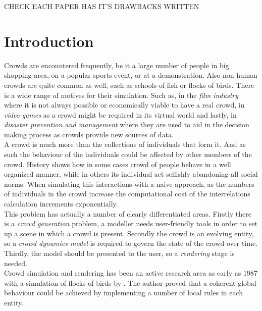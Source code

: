 \documentclass[6pt]{article} %
\begin{document}
\setcounter{page}{1} %
\columnsep 25.0pt %
\begin{multicols}{2} %
CHECK EACH PAPER HAS IT'S DRAWBACKS WRITTEN
\section{Introduction}
\label{intro}

Crowds are encountered frequently, be it a large number of people in big shopping area, on a popular sports event, or at a demonstration.
Also non human crowds are quite common as well, such as schools of fish or flocks of birds.
There is a wide range of motives for their simulation.
Such as, in the \textit{film industry} where it is not always possible or economically viable to have a real crowd, in \textit{video games} as a crowd might be required in its virtual world and lastly, in \textit{disaster prevention and management} where they are used to aid in the decision making process as crowds provide new sources of data.\\

A crowd is much more than the collections of individuals that form it.
And as such the behaviour of the individuals could be affected by other members of the crowd.
History shows how in some cases crowd of people behave in a well organized manner, while in others its individual act selfishly abandoning all social norms.
When simulating this interactions with a naive approach, as the numbers of individuals in the crowd increase the computational cost of the interrelations calculation increments exponentially.\\

This problem has actually a number of clearly differentiated areas.
Firstly there is a \textit{crowd generation} problem, a modeller needs user-friendly tools in order to set up a scene in which a crowd is present.
Secondly the crowd is an evolving entity, so a \textit{crowd dynamics model} is required to govern the state of the crowd over time.
Thirdly, the model should be presented to the user, so a \textit{rendering} stage is needed.\\

Crowd simulation and rendering has been an active research area as early as 1987 with a simulation of flocks of birds by \cite{Reynolds1987}.
The author proved that a coherent global behaviour could be achieved by implementing a number of local rules in each entity.


\end{multicols}
\end{document}
